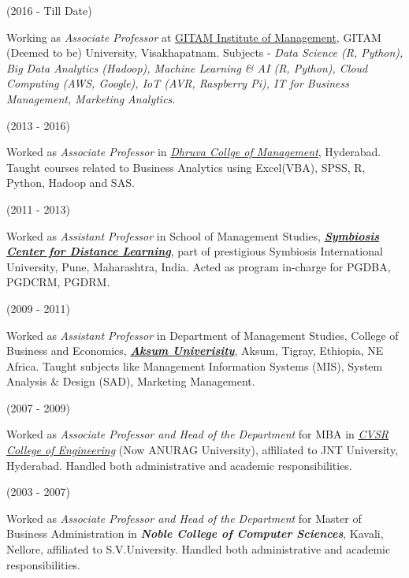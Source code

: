\documentclass[10pt]{article}
\begin{document}
\begin{description}
\item (2016 - Till Date)

Working as \emph{Associate Professor} at \href{https://gim.gitam.edu/}{GITAM Institute of Management}, GITAM (Deemed to be) University, Visakhapatnam. Subjects - \emph{Data Science (R, Python), Big Data Analytics (Hadoop), Machine Learning \& AI (R, Python), Cloud Computing (AWS, Google), IoT (AVR, Raspberry Pi), IT for Business Management, Marketing Analytics.}

\item (2013 - 2016)

Worked as \textit{Associate Professor} in \textit{\href{http://www.dhruva.ac.in/}{Dhruva Collge of Management}}, Hyderabad. Taught courses related to Business Analytics using Excel(VBA), SPSS, R, Python, Hadoop and SAS. 

\item (2011 - 2013)

Worked as \textit{Assistant Professor} in School of Management Studies, \href{http://www.scdl.net/}{\textit{\textbf{Symbiosis Center for Distance Learning}}}, part of prestigious Symbiosis International University, Pune, Maharashtra, India. Acted as program in-charge for PGDBA, PGDCRM, PGDRM. 

\item (2009 - 2011)

Worked as \textit{Assistant Professor} in Department of Management Studies, College of Business and Economics, \textit{\textbf{\href{www.aku.edu.et}{Aksum Univerisity}}}, Aksum, Tigray, Ethiopia, NE Africa. Taught subjects like Management Information Systems (MIS), System Analysis \& Design (SAD), Marketing Management. 

\item (2007 - 2009)

Worked  as  \textit{Associate Professor and Head of the Department} for MBA	in \emph{\href{http://www.cvsr.ac.in/}{CVSR  College of Engineering}} (Now ANURAG University), affiliated to JNT University, Hyderabad.	Handled both administrative and academic responsibilities. 

\item (2003 - 2007)

Worked as \textit{Associate Professor and Head of the Department} for Master of Business Administration  in  \emph{\textbf{Noble College of  Computer Sciences}}, Kavali, Nellore, affiliated to S.V.University. Handled both administrative and academic responsibilities.


\end{description}
\end{document}
